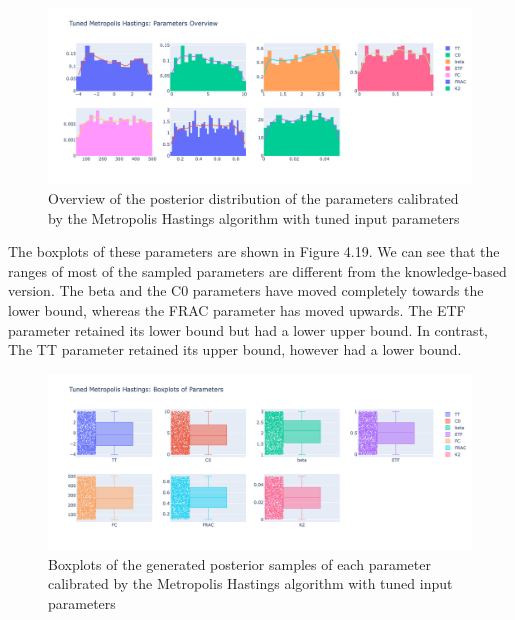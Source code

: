 \begin{figure}[H]
    \centering
    \includegraphics[width=1\textwidth]{figures/basic_mh/tuned_mh/tuned_mh_parameters_overview.png}
    \captionsetup{width=.8\textwidth}
    \caption{Overview of the posterior distribution of the parameters calibrated by the Metropolis Hastings algorithm with tuned input parameters}
    \label{fig:enter-label}
\end{figure}


The boxplots of these parameters are shown in Figure 4.19. We can see that the ranges of most of the sampled parameters are different from the knowledge-based version. The beta and the C0 parameters have moved completely towards the lower bound, whereas the FRAC parameter has moved upwards. The ETF parameter retained its lower bound but had a lower upper bound. In contrast, The TT parameter retained its upper bound, however had a lower bound.


\begin{figure}[H]
    \centering
    \includegraphics[width=1\textwidth]{figures/basic_mh/tuned_mh/tuned_mh_boxplot.png}
    \captionsetup{width=.8\textwidth}
    \caption{Boxplots of the generated posterior samples of each parameter calibrated by the Metropolis Hastings algorithm with tuned input parameters}
    \label{fig:enter-label}
\end{figure}


